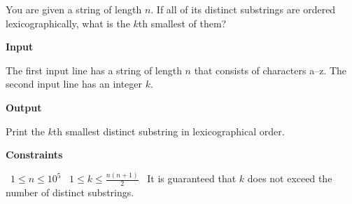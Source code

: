 You are given a string of length $n$. If all of its distinct substrings are ordered lexicographically, what is the $k$th smallest of them?

\vspace{0.3cm}\noindent\textbf{Input}

The first input line has a string of length $n$ that consists of characters a–z.
The second input line has an integer $k$.

\vspace{0.3cm}\noindent\textbf{Output}

Print the $k$th smallest distinct substring in lexicographical order.

\vspace{0.3cm}\noindent\textbf{Constraints}

\textbullet\ $1 \le n \le 10^5$
\textbullet\ $1 \le k \le \frac{n(n+1)}{2}$
\textbullet\ It is guaranteed that $k$ does not exceed the number of distinct substrings.